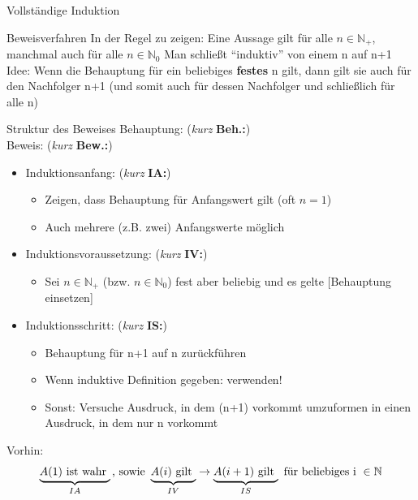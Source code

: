 \begin{frame}{Vollständige Induktion}
	\begin{itemize}
		\pitem Beweisverfahren
		\pitem In der Regel zu zeigen: Eine Aussage gilt für alle $n \in \mathbb{N}_+$, manchmal auch für alle $n \in \mathbb{N}_0$
		\pitem Man schließt ``induktiv'' von einem n auf n+1
		\pitem Idee: Wenn die Behauptung für ein beliebiges \textbf{festes} n gilt, dann gilt sie auch für den Nachfolger n+1 (und somit auch für dessen Nachfolger und schließlich für alle n)
	\end{itemize}
\end{frame}

\begin{frame}{Struktur des Beweises}
	\pause 
	Behauptung: (\textit {kurz} \textbf{Beh.:})\\
	Beweis: (\textit{kurz} \textbf{Bew.:})
	\begin{itemize}
		\pause
		\item Induktionsanfang: (\textit{kurz} \textbf{IA:})
		\begin{itemize}
			\item Zeigen, dass Behauptung für Anfangswert gilt (oft $n=1$)
			\item Auch mehrere (z.B. zwei) Anfangswerte möglich
		\end{itemize}
		\pause
		\item Induktionsvoraussetzung: (\textit{kurz} \textbf{IV:})
		\begin{itemize}
			\item Sei $n \in \mathbb{N}_+$ (bzw. $n \in \mathbb{N}_0$) fest aber beliebig und es gelte [Behauptung einsetzen]
		\end{itemize}
		\pause
		\item Induktionsschritt: (\textit{kurz} \textbf{IS:})
		\begin{itemize}
			\item Behauptung für n+1 auf n zurückführen
			\item Wenn induktive Definition gegeben: verwenden!
			\item Sonst: Versuche Ausdruck, in dem (n+1) vorkommt umzuformen in einen Ausdruck, in dem nur n vorkommt
		\end{itemize}
	\end{itemize}

	\p Vorhin:  \p
	\begin{align*}
	\underbrace{A(1) \text{ ist wahr }}_{IA} \text{, sowie } \underbrace{A(i)\text{ gilt }}_{IV} \rightarrow \underbrace{A(i+1) \text{ gilt }}_{IS} \text{ für beliebiges i }\in \mathbb{N}
	\end{align*}
\end{frame}
